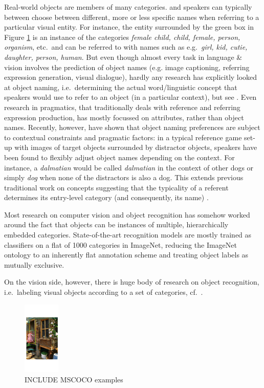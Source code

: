 \documentclass[runningheads]{llncs}
\begin{document}
Real-world objects are members of many categories. 
and speakers can typically between choose between different, more or less specific names when referring to a particular visual entity. 
For instance, the entity surrounded by the green box in Figure \ref{fig:example} is an instance of the categories \textit{female child, child, female, person, organism}, etc.\  and can be referred to with names such as e.g.\ \textit{girl, kid, cutie, daughter, person, human}.
But even though almost every task in language \& vision involves the prediction of object names (e.g. image captioning, referring expression generation, visual dialogue), hardly any research has explicitly looked at object naming, i.e.\ determining the actual word/linguistic concept that speakers would use to refer to an object (in a particular context), but see \cite{Ordonez:2016,zarriess-schlangen:2017}.
Even research in pragmatics, that traditionally deals with reference and referring expression production, has mostly focussed on attributes, rather than object names.
Recently, however, \cite{graf2016animal} have shown that object naming preferences are subject to contextual constraints and pragmatic factors: in a typical reference game set-up with images of target objects surrounded by distractor objects, speakers have been found to flexibly adjust object names depending on the context. For instance, a \textit{dalmatian} would be called \textit{dalmatian} in the context of other dogs or simply \textit{dog} when none of the distractors is also a dog.
This extends previous traditional work on concepts suggesting that the typicality of a referent determines its entry-level category (and consequently, its name) \cite{Rosch1978}.


Most research on computer vision and object recognition has somehow worked around the fact that objects can be instances of multiple, hierarchically embedded categories. 
State-of-the-art recognition models are mostly trained as classifiers on a flat of 1000 categories in ImageNet, reducing the ImageNet ontology to an inherently flat annotation scheme and treating
object labels as mutually exclusive.

On the vision side, however, there is huge body of research on object recognition, i.e.\ labeling visual objects according to a set of categories, cf.\ \cite{simonyan2014very,deng2014large,googlenet}.

\begin{figure}
\centering
\includegraphics[height=3.5cm]{fig/flickr_1000268201_boxes}
\caption{INCLUDE MSCOCO examples}
\label{fig:example}
\end{figure}
\end{document}
